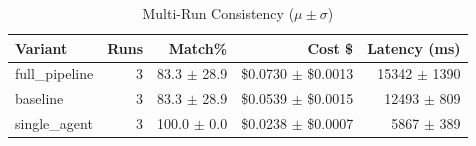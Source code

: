 \begin{table}[htbp]
\centering
\caption{Multi-Run Consistency ($\mu \pm \sigma$)}
\label{tab:consistency}
\begin{tabular}{l r rrr}
\toprule
Variant & Runs & Match\% & Cost \$ & Latency (ms) \\
\midrule
  full\_pipeline & 3 & 83.3 $\pm$ 28.9 & \$0.0730 $\pm$ \$0.0013 & 15342 $\pm$ 1390 \\
  baseline & 3 & 83.3 $\pm$ 28.9 & \$0.0539 $\pm$ \$0.0015 & 12493 $\pm$ 809 \\
  single\_agent & 3 & 100.0 $\pm$ 0.0 & \$0.0238 $\pm$ \$0.0007 & 5867 $\pm$ 389 \\
\bottomrule
\end{tabular}
\end{table}
